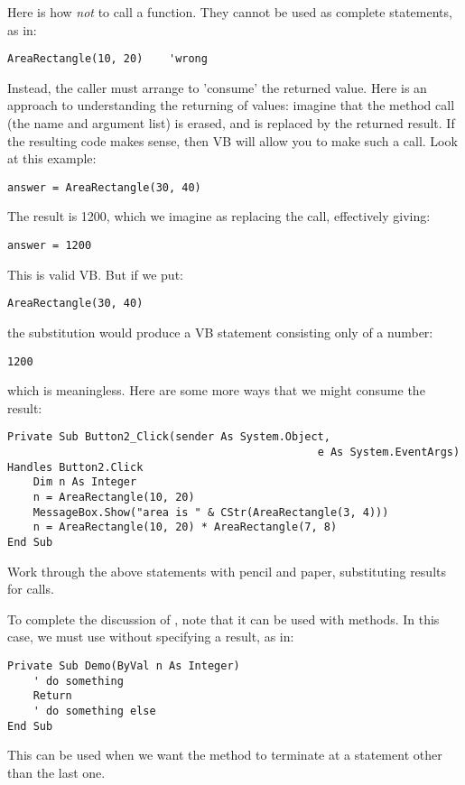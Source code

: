 		Here is how \emph{not} to call a function. They cannot be used as complete statements, as in:
		\begin{lstlisting}
AreaRectangle(10, 20)    'wrong
		\end{lstlisting}
		Instead, the caller must arrange to 'consume' the returned value. Here is an approach to understanding the returning of values: imagine that the method call (the name and argument list) is erased, and is replaced by the returned result. If the resulting code makes sense, then VB will allow you to make such a call. Look at this example:
		\begin{lstlisting}
answer = AreaRectangle(30, 40)
		\end{lstlisting}
		The result is 1200, which we imagine as replacing the call, effectively giving:
		\begin{lstlisting}
answer = 1200
		\end{lstlisting}
		This is valid VB. But if we put:
		\begin{lstlisting}
AreaRectangle(30, 40)
		\end{lstlisting}
		the substitution would produce a VB statement consisting only of a number:
		\begin{lstlisting}
1200
		\end{lstlisting}
		which is meaningless. Here are some more ways that we might consume the result:
		\begin{lstlisting}
Private Sub Button2_Click(sender As System.Object,
												e As System.EventArgs) Handles Button2.Click
	Dim n As Integer
	n = AreaRectangle(10, 20)
	MessageBox.Show("area is " & CStr(AreaRectangle(3, 4)))
	n = AreaRectangle(10, 20) * AreaRectangle(7, 8)
End Sub
		\end{lstlisting}

		\begin{stqb}
			\begin{STQ}
				\item	Work through the above statements with pencil and paper, substituting results for calls.
			\end{STQ}
		\end{stqb}
		To complete the discussion of , note that it can be used with  methods. In this case, we must use  without specifying a result, as in:
		\begin{lstlisting}
Private Sub Demo(ByVal n As Integer)
	' do something
	Return
	' do something else
End Sub
		\end{lstlisting}
		This can be used when we want the method to terminate at a statement other than the last one.
		
